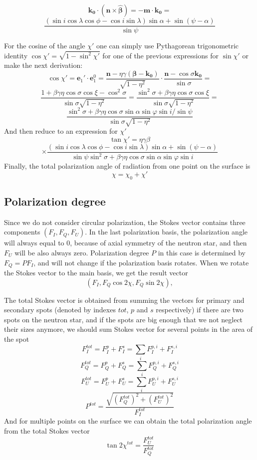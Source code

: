 \documentclass[iop, usenatbib]{emulateapj}
\newcommand{\be}{\begin{equation}}
\newcommand{\ee}{\end{equation}}
\begin{document}
\be
 \bm{k_0} \cdot (\bm{n}\times\bm{\hat\beta} )= -\bm{m} \cdot \bm{k_0}  = 
\ee$$
 \frac{ (\sin{i}\cos\lambda\cos\phi-\cos{i}\sin\lambda)\sin\alpha + \sin{(\psi-\alpha)}}{\sin{\psi}}
$$

For the cosine of the angle  $\chi'$ one can simply use  Pythagorean trigonometric identity $\cos{\chi'}=\sqrt{1-\sin^2{\chi'}}$ for one of the previous expressions for $\sin{\chi'}$ or make the next derivation: 
$$
\cos{\chi'}=\bm{e}_1'\cdot \bm{e}_1^0 = 
 \frac{\bm{n}-\eta\gamma (\bm{\beta-k_0})}{\sqrt{1-\eta^2 } } \cdot 
\frac{\bm{n}-\cos{\sigma} \bm{k_0}}{\sin{\sigma}}=$$$$
 \frac{1 + \beta\gamma\eta\cos\sigma\cos\xi-\cos^2 \sigma}{\sin\sigma\sqrt{1-\eta^2}} =
 \frac{\sin^2 \sigma + \beta\gamma\eta\cos\sigma\cos\xi}{\sin\sigma\sqrt{1-\eta^2}}=$$\be
 \frac{\sin^2 \sigma + \beta\gamma\eta\cos\sigma\sin\alpha\sin\varphi\sin{i}/\sin\psi}{\sin\sigma\sqrt{1-\eta^2}}
 \ee
And then reduce to an expression for $\chi'$\be
\tan\chi' 
= \eta\gamma\beta \ee$$\times 
\frac{
 (\sin{i}\cos\lambda\cos\phi-\cos{i}\sin\lambda)\sin\alpha + \sin{(\psi-\alpha)}
}{
\sin\psi\sin^2 \sigma + \beta\gamma\eta\cos\sigma\sin\alpha\sin\varphi\sin{i}
}
$$
Finally, the total polarization angle of radiation from one point on the surface is\be
\chi=\chi_0+\chi'\ee

\subsection{Polarization degree}
Since we do not consider circular polarization, the Stokes vector contains three components $(F_I,F_Q,F_U)$.
In the last polarization basis, the polarization angle will always equal to 0, because of axial symmetry of the neutron star, and then $F_U$ will be also always zero. Polarization degree $P$ in this case is determined by  $F_Q=P F_I$, and will not change if the polarization basis rotates. When we rotate the Stokes vector to the main basis, we get the result vector $$(F_I, F_Q \cos{2\chi},F_Q \sin{2\chi}),$$   

The total Stokes vector is obtained from summing the vectors for primary and secondary spots (denoted by indexes $tot$, $p$ and $s$ respectively) if there are two spots on the neutron star, and if the spots are big enough that we not neglect their sizes anymore, we should sum Stokes vector for several points in the area of the spot$$
F_I^{tot}=F_I^p+F_I^s = \sum_i F_I^{p,i}+F_I^{s,i}$$\be
F_Q^{tot}=F_Q^p+F_Q^s = \sum_i F_Q^{p,i}+F_Q^{s,i}\ee$$
F_U^{tot}=F_U^p+F_U^s= \sum_i F_U^{p,i}+F_U^{s,i} $$\be
P^{tot}=\frac{\sqrt{(F_Q^{tot})^2+(F_U^{tot})^2}}{F_I^{tot}}\ee
And for multiple points on the surface we can obtain the total polarization angle from the total Stokes vector\be
\tan{2\chi^{tot}}=\frac{F_U^{tot}}{F_Q^{tot}}\ee
\end{document}
